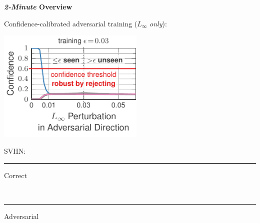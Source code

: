 \documentclass[64pt]{beamer}
\begin{document}
	\begin{frame}[t]{\bfseries \textit{2-Minute} Overview}
		\Large
		
		Confidence-calibrated adversarial training ($L_\infty$ \emph{only}):
		
		\vskip -0.25cm
		\begin{minipage}[t]{0.7\textwidth}
			\vspace*{0px}
			\hfill
			\includegraphics[width=7cm]{fig/introduction/ours10_1_adversarial_unseen_annotated}
		\end{minipage}
		\hfill
		\begin{minipage}[t]{0.28\textwidth}
			\vspace*{15px}
			
			\begin{tcolorbox}[
				left=0pt,
				right=0pt,
				top=0pt,
				bottom=0pt,
				colback=gray!12!white,
				colframe=gray!12!white,
				width=1\textwidth, 
				enlarge left by=0mm,
				boxsep=5pt,
				arc=0pt,outer arc=0pt,
				boxrule=1pt,
				]
				\large\color{MPIIblack}
				SVHN:\\
				\textcolor{colorbrewer2}{{\rule[4pt]{10pt}{2pt} Correct}}\\ \textcolor{colorbrewer8}{{\rule[4pt]{10pt}{2pt} Adversarial}}
			\end{tcolorbox}
		\end{minipage}
	\end{frame}
\end{document}
